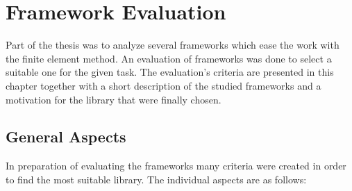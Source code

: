 \section{Framework Evaluation}
Part of the thesis was to analyze several frameworks which ease the work with the finite element method. An evaluation of frameworks was done to select a suitable one for the given task. The evaluation's criteria are presented in this chapter together with a short description of the studied frameworks and a motivation for the library that were finally chosen.
 
 
 
 \subsection{General Aspects}
 In preparation of evaluating the frameworks many criteria were created in order to find the most suitable library. The individual aspects are as follows:
